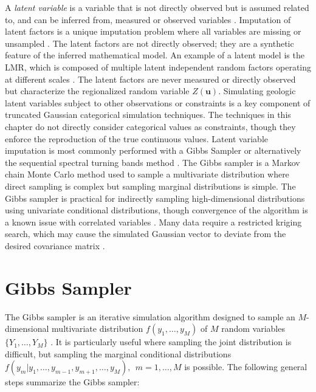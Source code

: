 A \textit{latent variable} is a variable that is not directly observed but is assumed related to, and can be inferred from, measured or observed variables \citep{everitt2010cambridge}. Imputation of latent factors is a unique imputation problem where all variables are missing or unsampled \citep{little2019statistical}. The latent factors are not directly observed; they are a synthetic feature of the inferred mathematical model. An example of a latent model is the \gls{LMR}, which is composed of multiple latent independent random factors operating at different scales \citep{goovaerts1992factorial}. The latent factors are never measured or directly observed but characterize the regionalized random variable $Z(\mathbf{u})$. Simulating geologic latent variables subject to other observations or constraints is a key component of truncated Gaussian categorical simulation techniques. The techniques in this chapter do not directly consider categorical values as constraints, though they enforce the reproduction of the true continuous values. Latent variable imputation is most commonly performed with a Gibbs Sampler \citep{emery2014simulating,silva2017multiple,arroyo2020iterative,madani2021enhanced} or alternatively the sequential spectral turning bands method \citep{lauzon2020calibration,lauzon2020sequential,lauzon2023joint}. The Gibbs sampler is a Markov chain Monte Carlo method used to sample a multivariate distribution where direct sampling is complex but sampling marginal distributions is simple. The Gibbs sampler is practical for indirectly sampling high-dimensional distributions using univariate conditional distributions, though convergence of the algorithm is a known issue with correlated variables \citep{silva2018enhanced}. Many data require a restricted kriging search, which may cause the simulated Gaussian vector to deviate from the desired covariance matrix \citep{emery2014simulating}.


\FloatBarrier
\section{Gibbs Sampler}
\label{sec:05gibbs}

The Gibbs sampler \citep{geman1984stochastic} is an iterative simulation algorithm designed to sample an $M$-dimensional multivariate distribution $f(y_{1}, \dots, y_{M})$ of $M$ random variables $\{Y_{1}, \dots, Y_{M}\}$ \citep{little2019statistical}. It is particularly useful where sampling the joint distribution is difficult, but sampling the marginal conditional distributions $f(y_{m}|y_{1},\dots,y_{m-1},y_{m+1},\dots,y_{M}), \ \ m=1,\dots,M$ is possible. The following general steps summarize the Gibbs sampler:

